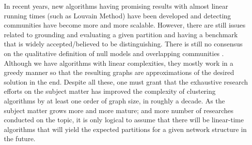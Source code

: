 \documentclass[10pt]{article}
\begin{document}
In recent years, new algorithms having promising results with almost linear running times (such as Louvain Method) have been developed and detecting communities have become more and more scalable. However, there are still issues related to grounding and evaluating a given partition and having a benchmark that is widely accepted/believed to be distinguishing. There is still no consensus on the qualitative definition of null models and overlapping communities \cite{fortunato}. Although we have algorithms with linear complexities, they mostly work in a greedy manner so that the resulting graphs are approximations of the desired solution in the end. Despite all these, one must grant that the exhaustive research efforts on the subject matter has improved the complexity of clustering algorithms by at least one order of graph size, in roughly a decade. As the subject matter grows more and more mature; and more number of researches conducted on the topic, it is only logical to assume that there will be linear-time algorithms that will yield the expected partitions for a given network structure in the future. \\
\end{document}

